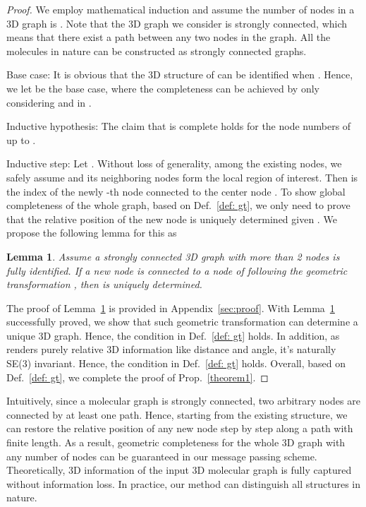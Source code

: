 \documentclass{article}
\newtheorem{lemma}{Lemma}
\begin{document}
\begin{proof}
\vspace{-5 pt}
We employ mathematical induction and assume the number of nodes in a 3D graph is .
\textcolor{COLOR}{Note that the 3D graph we consider is strongly connected, which means that there exist a path between any two nodes in the graph. All the molecules in nature can be constructed as strongly connected graphs.}

Base case: It is obvious that the 3D structure of  can be identified when .
Hence, we let  be the base case, where the completeness can be achieved by only considering  and  in .

Inductive hypothesis: The claim that  is complete holds for the node numbers of  up to .

Inductive step: Let . Without loss of generality, among the existing  nodes, we safely assume  and 
its neighboring nodes  form the local region of interest.
Then  is the index of the newly -th node connected to the center node .
To show global completeness of the whole graph, based on Def.~\ref{def: gt},
we only need to prove that the relative position of the new node  is uniquely determined given
.
We propose the following lemma for this as

\begin{lemma}
Assume a strongly connected 3D graph  with more than 2 nodes is fully identified.
If a new node  is connected to a node  of  following the geometric transformation , then  is uniquely determined.
\label{lemma1}
\vspace{-5 pt}
\end{lemma}
The proof of Lemma~\ref{lemma1} is provided in Appendix~\ref{sec:proof}.
With Lemma~\ref{lemma1} successfully proved, we show that such geometric transformation 
can determine a unique 3D graph.
Hence, the  condition in Def.~\ref{def: gt} holds.
In addition, as  renders purely relative 3D information like distance and angle, it's naturally 
SE(3) invariant. 
Hence, the  condition in Def.~\ref{def: gt} holds.
Overall, based on Def.~\ref{def: gt}, we complete the proof of Prop.~\ref{theorem1}.
\vspace{-5 pt}
\end{proof}

Intuitively, since a molecular graph is strongly connected, two
arbitrary nodes are connected by at least one path. Hence, starting from the existing structure, we can restore the relative position of any new node step by step along a path with finite length.
As a result, geometric completeness for the whole 3D graph with any number of nodes can be guaranteed in our message passing scheme.
Theoretically, 3D information of the input 3D molecular graph
is fully captured without information loss.
In practice, our method can distinguish
all structures in nature.
\end{document}
